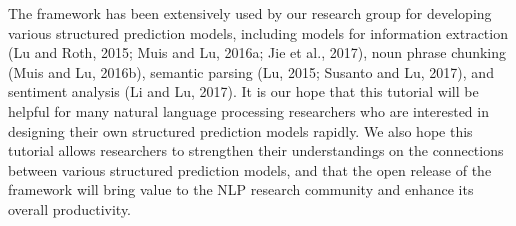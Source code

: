\begin{tutorial}
The framework has been extensively used by our research group for developing various structured prediction models, including models for information extraction (Lu and Roth, 2015; Muis and Lu, 2016a; Jie et al., 2017), noun phrase chunking (Muis and Lu, 2016b), semantic parsing (Lu, 2015; Susanto and Lu, 2017), and sentiment analysis (Li and Lu, 2017). It is our hope that this tutorial will be helpful for many natural language processing researchers who are interested in designing their own structured prediction models rapidly. We also hope this tutorial allows researchers to strengthen their understandings on the connections between various structured prediction models, and that the open release of the framework will bring value to the NLP research community and enhance its overall productivity.

\end{tutorial} 
